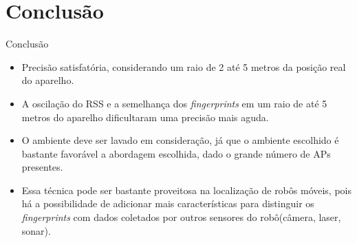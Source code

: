 \documentclass{beamer}
\newlength{\wideitemsep}
\let\olditem\item
\renewcommand{\item}{\setlength{\itemsep}{\wideitemsep}\olditem}
\begin{document}
\section{Conclusão}
\begin{frame}{Conclusão}
\begin{itemize}
 \item Precisão satisfatória, considerando um raio de 2 até 5 metros da posição real do aparelho.
 \item A oscilação do RSS e a semelhança dos \textit{fingerprints} em um raio de até 5 metros do aparelho
  dificultaram uma precisão mais aguda.
  \item O ambiente deve ser lavado em consideração, já que o ambiente escolhido é bastante favorável a abordagem escolhida, dado
      o grande número de APs presentes.
 \item Essa técnica pode ser bastante proveitosa na localização de robôs móveis, pois há 
      a possibilidade de adicionar mais características para distinguir os \textit{fingerprints} com 
      dados coletados por outros sensores do robô(câmera, laser, sonar).
\end{itemize}
\end{frame}
\end{document}
